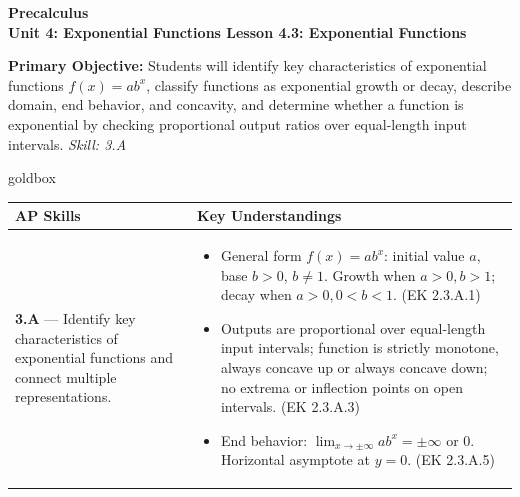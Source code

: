 \documentclass[10pt]{article}
\newcommand{\CourseName}{Precalculus}
\newcommand{\UnitNumberName}{Unit 4: Exponential Functions \quad}
\newcommand{\LessonNumberName}{Lesson 4.3: Exponential Functions}
\begin{document}
\begin{center}
    {\Large\bfseries \CourseName \\
    {\small\bfseries \UnitNumberName \LessonNumberName}}
\end{center}

\begin{tcolorbox}[colback=sky, colframe=navy, boxrule=0.9pt, arc=2mm,
    left=2mm, right=2mm, top=1.5mm, bottom=1.5mm]
    \textbf{Primary Objective:} Students will identify key characteristics of exponential functions
    $f(x) = ab^x$, classify functions as exponential growth or decay, describe domain, end behavior,
    and concavity, and determine whether a function is exponential by checking proportional output
    ratios over equal-length input intervals.
    \hfill\textit{\small Skill: 3.A}
\end{tcolorbox}

\renewcommand{\arraystretch}{1.6}
\begin{skillbox}{goldbox}
\begin{tabularx}{\linewidth}{@{}X X@{}}
\textbf{AP Skills} &
\textbf{Key Understandings} \\
\midrule
\textbf{3.A} --- Identify key characteristics of exponential functions and connect
multiple representations. &
\begin{itemize}[leftmargin=1.2em,itemsep=2pt,topsep=0pt]
  \item General form $f(x) = ab^x$: initial value $a$, base $b > 0$, $b \ne 1$.
        Growth when $a > 0, b > 1$; decay when $a > 0, 0 < b < 1$. (EK 2.3.A.1)
  \item Outputs are proportional over equal-length input intervals; function is strictly
        monotone, always concave up or always concave down; no extrema or inflection
        points on open intervals. (EK 2.3.A.3)
  \item End behavior: $\displaystyle\lim_{x\to\pm\infty} ab^x = \pm\infty$ or $0$.
        Horizontal asymptote at $y = 0$. (EK 2.3.A.5)
\end{itemize} \\
\end{tabularx}
\end{skillbox}
\end{document}

